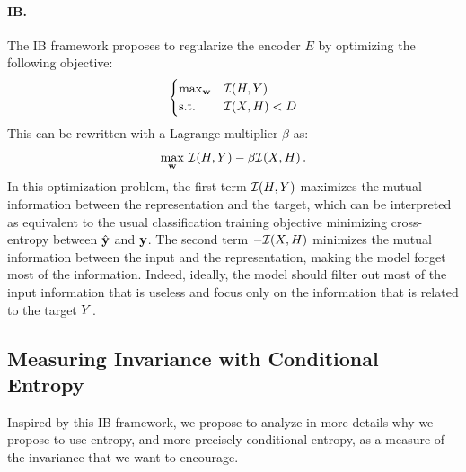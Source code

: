     \paragraph{\acf{IB}.} The \acf{IB} framework proposes to regularize the encoder $E$ by optimizing the following objective:
    \begin{equation}
        \begin{cases}
        \max_{\mathbf{w}} & \mathcal{I}(H, Y)\\
        \text{s.t.} & \mathcal{I}(X, H) < D
        \end{cases}
    \end{equation}
    This can be rewritten with a Lagrange multiplier $\beta$ as:
    \begin{equation}
        \max_{\mathbf{w}}\, \mathcal{I}(H, Y) - \beta \mathcal{I}(X, H) \,.
    \end{equation}
    In this optimization problem, the first term $\mathcal{I}(H, Y)$ maximizes the mutual information between the representation and the target, which can be interpreted as equivalent to the usual classification training objective minimizing cross-entropy between $\hat{\mathbf{y}}$ and $\mathbf{y}$. The second term $-\mathcal{I}(X, H)$ minimizes the mutual information between the input and the representation, making the model forget most of the information. Indeed, ideally, the model should filter out most of the input information that is useless and focus only on the information that is related to the target $Y$.

    \subsection{Measuring Invariance with Conditional Entropy} \label{shade:sec:intuition}

    Inspired by this \ac{IB} framework, we propose to analyze in more details why we propose to use entropy, and more precisely conditional entropy, as a measure of the invariance that we want to encourage.

